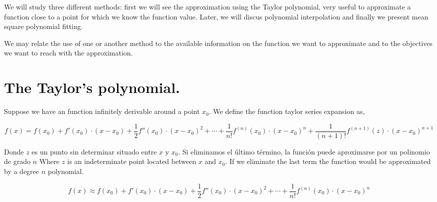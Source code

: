 \begin{paracol}{2}
We will study three different methods: first we will see the approximation using the Taylor polynomial, very useful to approximate a function close to a point for which we know the function value. Later, we will discus polynomial interpolation and finally we present mean square polynomial fitting. 

We may relate the use of one or another method to the available information on the function we want to approximate and to the objectives we want to reach with the approximation.

\section{The Taylor's polynomi\-al.}
Suppose we have an function infinitely derivable around a point $x_0$. We define the function taylor series expansion as,
\end{paracol}
\begin{equation*}
f(x)=f(x_0)+f'(x_0)\cdot (x-x_0)+\frac{1}{2} f''(x_0)\cdot (x-x_0)^2+\cdots + \frac{1}{n!}f^{(n)}(x_0)\cdot (x-x_0)^n+ \frac{1}{(n+1)!}f^{(n+1)}(z)\cdot (x-x_0)^{n+1}
\end{equation*}

\begin{paracol}{2}
Donde $z$ es un punto sin determinar situado entre $x$  y $x_0$. Si eliminamos el último término, la función puede aproximarse por un polinomio de grado $n$
\switchcolumn
Where $z$ is an indeterminate point located between $x$ and $x_0$. If we eliminate the last term the function would be approximated by a degree $n$ polynomial. 								
\end{paracol}

\begin{equation*}
f(x)\approx f(x_0)+f'(x_0)\cdot (x-x_0)+\frac{1}{2}f''(x_0)\cdot (x-x_0)^2+\cdots + \frac{1}{n!}f^{(n)}(x_0)\cdot (x-x_0)^n
\end{equation*}

